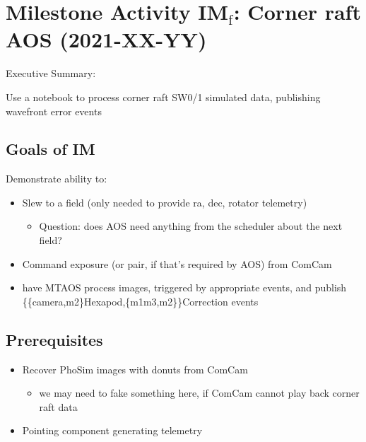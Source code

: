 \section{Milestone Activity IM\(_{\text{f}}\): Corner raft AOS                     (2021-XX-YY)}
\label{sec:org56c5b30}
Executive Summary:

Use a notebook to process corner raft SW0/1 simulated data, publishing wavefront error events

\subsection{Goals of IM}

Demonstrate ability to:
\begin{itemize}
\item Slew to a field (only needed to provide ra, dec, rotator telemetry)
  \begin{itemize}
  \item Question: does AOS need anything from the scheduler about the next field?
  \end{itemize}
\item Command exposure (or pair, if that's required by AOS) from ComCam
\item have MTAOS process images, triggered by appropriate events, and publish \{\{camera,m2\}Hexapod,\{m1m3,m2\}\}Correction events
\end{itemize}

\subsection{Prerequisites}
\begin{itemize}
\item Recover PhoSim images with donuts from ComCam
  \begin{itemize}
  \item we may need to fake something here, if ComCam cannot play back corner raft data
  \end{itemize}
\item Pointing component generating telemetry
\end{itemize}
